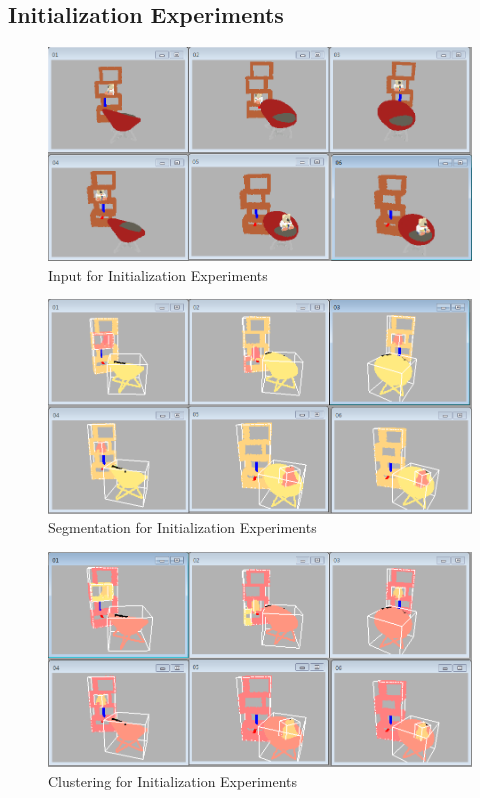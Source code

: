\subsection{Initialization Experiments}
\begin{figure}
	\centering
	\includegraphics[width=\textwidth]{images/init_input.png}
	\caption{Input for Initialization Experiments}
	\label{fig:input_for_init}
\end{figure}
\begin{figure}
	\centering
	\includegraphics[width=\textwidth]{images/init_seg.png}
	\caption{Segmentation for Initialization Experiments}
	\label{fig:seg_for_init}
\end{figure}
\begin{figure}
	\centering
	\includegraphics[width=\textwidth]{images/init_cluster.png}
	\caption{Clustering for Initialization Experiments}
	\label{fig:cluster_for_init}
\end{figure}
